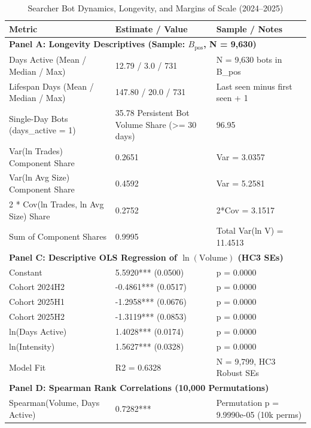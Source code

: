 \begin{table}[htbp]
\centering
\caption{Searcher Bot Dynamics, Longevity, and Margins of Scale (2024--2025)}
\label{tab:bot_dynamics}
\begin{tabular}{lll}
\toprule
Metric & Estimate / Value & Sample / Notes \\
\midrule
\multicolumn{3}{l}{\textbf{Panel A: Longevity Descriptives (Sample: $B_{\text{pos}}$, N = 9,630)}} \\
\midrule
Days Active (Mean / Median / Max) & 12.79 / 3.0 / 731 & N = 9,630 bots in B_pos \\
Lifespan Days (Mean / Median / Max) & 147.80 / 20.0 / 731 & Last seen minus first seen + 1 \\
Single-Day Bots (days_active = 1) & 35.78%
Persistent Bot Volume Share (>= 30 days) & 96.95%
\midrule
\multicolumn{3}{l}{\textbf{Panel B: Exact Variance Decomposition of $\ln(\text{Volume})$}} \\
\midrule
Var(ln Trades) Component Share & 0.2651 & Var = 3.0357 \\
Var(ln Avg Size) Component Share & 0.4592 & Var = 5.2581 \\
2 * Cov(ln Trades, ln Avg Size) Share & 0.2752 & 2*Cov = 3.1517 \\
Sum of Component Shares & 0.9995 & Total Var(ln V) = 11.4513 \\
\midrule
\multicolumn{3}{l}{\textbf{Panel C: Descriptive OLS Regression of $\ln(\text{Volume})$ (HC3 SEs)}} \\
\midrule
Constant & 5.5920*** (0.0500) & p = 0.0000 \\
Cohort 2024H2 & -0.4861*** (0.0517) & p = 0.0000 \\
Cohort 2025H1 & -1.2958*** (0.0676) & p = 0.0000 \\
Cohort 2025H2 & -1.3119*** (0.0853) & p = 0.0000 \\
ln(Days Active) & 1.4028*** (0.0174) & p = 0.0000 \\
ln(Intensity) & 1.5627*** (0.0328) & p = 0.0000 \\
Model Fit & R2 = 0.6328 & N = 9,799, HC3 Robust SEs \\
\midrule
\multicolumn{3}{l}{\textbf{Panel D: Spearman Rank Correlations (10,000 Permutations)}} \\
\midrule
Spearman(Volume, Days Active) & 0.7282*** & Permutation p = 9.9990e-05 (10k perms) \\

\end{tabular}
\end{table}
